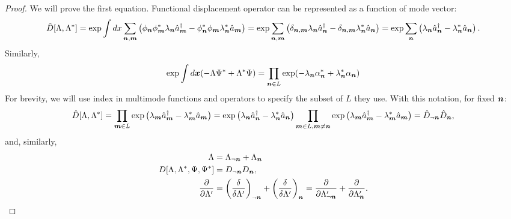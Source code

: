 \begin{proof}
We will prove the first equation.
Functional displacement operator can be represented as a function of mode vector:
\begin{equation*}
\begin{split}
	\hat{D}[\Lambda, \Lambda^*]
	= \exp \int dx \sum_{\boldsymbol{n},\boldsymbol{m}} \left(
		\phi_{\boldsymbol{n}} \phi_{\boldsymbol{m}}^* \lambda_{\boldsymbol{n}} \hat{a}_{\boldsymbol{m}}^\dagger
		- \phi_{\boldsymbol{n}}^* \phi_{\boldsymbol{m}} \lambda_{\boldsymbol{n}}^* \hat{a}_{\boldsymbol{m}}
	\right)
	= \exp \sum_{\boldsymbol{n},\boldsymbol{m}} \left(
		\delta_{\boldsymbol{n},\boldsymbol{m}} \lambda_{\boldsymbol{n}} \hat{a}_{\boldsymbol{n}}^\dagger
		- \delta_{\boldsymbol{n},\boldsymbol{m}} \lambda_{\boldsymbol{n}}^* \hat{a}_{\boldsymbol{n}}
	\right)
	= \exp \sum_{\boldsymbol{n}} \left(
		\lambda_{\boldsymbol{n}} \hat{a}_{\boldsymbol{n}}^\dagger - \lambda_{\boldsymbol{n}}^* \hat{a}_{\boldsymbol{n}}
	\right).
\end{split}
\end{equation*}
Similarly,
\[
	\exp \int d\boldsymbol{x} (-\Lambda \Psi^* + \Lambda^* \Psi)
	= \prod_{\boldsymbol{n} \in L} \exp
		(-\lambda_{\boldsymbol{n}} \alpha_{\boldsymbol{n}}^* + \lambda_{\boldsymbol{n}}^* \alpha_{\boldsymbol{n}})
\]
For brevity, we will use index in multimode functions and operators to specify the subset of $L$ they use.
With this notation, for fixed $\boldsymbol{n}$:
\[
	\hat{D}[\Lambda, \Lambda^*]
	= \prod_{\boldsymbol{m} \in L} \exp \left(
		\lambda_{\boldsymbol{m}} \hat{a}_{\boldsymbol{m}}^\dagger - \lambda_{\boldsymbol{m}}^* \hat{a}_{\boldsymbol{m}}
	\right)
	= \exp \left(
		\lambda_{\boldsymbol{n}} \hat{a}_{\boldsymbol{n}}^\dagger - \lambda_{\boldsymbol{n}}^* \hat{a}_{\boldsymbol{n}}
	\right)
	\prod_{\boldsymbol{m} \in L, \boldsymbol{m} \ne \boldsymbol{n}} \exp \left(
		\lambda_{\boldsymbol{m}} \hat{a}_{\boldsymbol{m}}^\dagger - \lambda_{\boldsymbol{m}}^* \hat{a}_{\boldsymbol{m}}
	\right)
	= \hat{D}_{\lnot \boldsymbol{n}} \hat{D}_{\boldsymbol{n}},
\]
and, similarly,
\begin{equation*}
\begin{split}
	\Lambda & = \Lambda_{\lnot \boldsymbol{n}} + \Lambda_{\boldsymbol{n}} \\
	D[\Lambda, \Lambda^*, \Psi, \Psi^*]	& = D_{\lnot \boldsymbol{n}} D_{\boldsymbol{n}}, \\
	\frac{\partial}{\partial \Lambda^\prime}
	& = \left( \frac{\delta}{\delta \Lambda^\prime} \right)_{\lnot \boldsymbol{n}}
	+ \left( \frac{\delta}{\delta \Lambda^\prime} \right)_{\boldsymbol{n}}
	= \frac{\partial}{\partial \Lambda_{\lnot \boldsymbol{n}}^\prime}
	+ \frac{\partial}{\partial \Lambda_{\boldsymbol{n}}^\prime}.
\end{split}
\end{equation*}


\end{proof}
